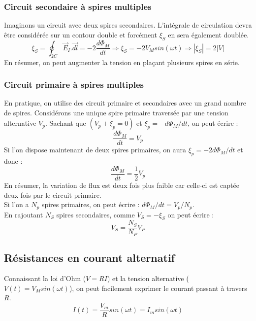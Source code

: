 \documentclass[british,french,11pt, a4paper, openany]{book}
\begin{document}
\subsubsection{Circuit secondaire à spires multiples}
Imaginons un circuit avec deux spires secondaires. L'intégrale de circulation devra être considérée sur un contour double et forcément $\xi_S$ en sera également doublée.
\begin{equation}
	\xi_S = \oint_{2C} \vec{E}_I.\vec{dl} = -2\frac{d\Phi_M}{dt} \Rightarrow \xi_S = -2V_M sin(\omega t) \Rightarrow |\xi_S| = 2|V|
\end{equation}
En résumer, on peut augmenter la tension en plaçant plusieurs spires en série.

\subsubsection{Circuit primaire à spires multiples}
En pratique, on utilise des circuit primaire et secondaires avec un grand nombre de spires. Considérons une unique spire primaire traversée par une tension alternative $V_p$. Sachant que $(V_p + \xi_p = 0)$ et $\xi_p = -d\Phi_M/dt$, on peut écrire : 
\begin{equation}
	\frac{d\Phi_M}{dt} = V_p
\end{equation}
Si l'on dispose maintenant de deux spires primaires, on aura $\xi_p = -2d\Phi_M/dt$ et donc : 
\begin{equation}
	\frac{d\Phi_M}{dt} = \frac{1}{2}V_p
\end{equation}
En résumer, la variation de flux est deux fois plus faible car celle-ci est captée deux fois par le circuit primaire.\\
Si l'on a $N_p$ spires primaires, on peut écrire : $d\Phi_M/dt = V_p/N_p$.\\

En rajoutant $N_S$ spires secondaires, comme $V_S = - \xi_S$ on peut écrire :
\begin{equation}
	V_S = \frac{N_S}{N_P}V_P
\end{equation}

\subsection{Résistances en courant alternatif}
Connaissant la loi d'Ohm ($V = RI$) et la tension alternative ($V(t) = V_M sin(\omega t)$), on peut facilement exprimer le courant passant à travers $R$.
\begin{equation}
	I(t) = \frac{V_m}{R} sin(\omega t) = I_m sin(\omega t)
\end{equation}
\end{document}
